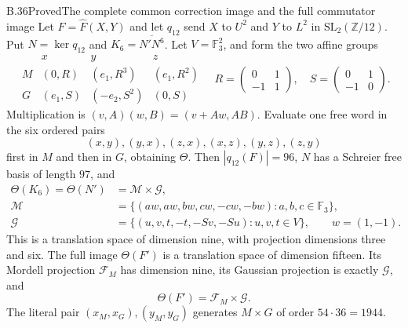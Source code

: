 \begin{statement}{B.36}{Proved}{The complete common correction image and the full commutator image}
Let $F=\widehat F(X,Y)$ and let $q_{12}$ send $X$ to
$U^2$ and $Y$ to $L^2$ in $\mathrm{SL}_2(\mathbb Z/12)$.
Put $N=\ker q_{12}$ and $K_6=\overline{N'N^6}$.
Let $V=\mathbb F_3^2$, and form the two affine groups
\[
 \begin{array}{c|ccc}
 &x&y&z\\ \hline
 M&(0,R)&(e_1,R^3)&(e_1,R^2)\\
 G&(e_1,S)&(-e_2,S^2)&(0,S)
 \end{array}
 \quad
 R=\begin{pmatrix}0&1\\-1&1\end{pmatrix},\quad
 S=\begin{pmatrix}0&1\\-1&0\end{pmatrix}.
\]
Multiplication is $(v,A)(w,B)=(v+Aw,AB)$. Evaluate one free
word in the six ordered pairs
\[
 (x,y),(y,x),(z,x),(x,z),(y,z),(z,y)
\]
first in $M$ and then in $G$, obtaining $\Theta$.
Then $|q_{12}(F)|=96$, $N$ has a Schreier free basis of length
$97$, and
\[
 \begin{split}
 \Theta(K_6)=\Theta(N')&=\mathcal M\times\mathcal G,\\
 \mathcal M&=\{(aw,aw,bw,cw,-cw,-bw):a,b,c\in\mathbb F_3\},\\
 \mathcal G&=\{(u,v,t,-t,-Sv,-Su):u,v,t\in V\},
 \qquad w=(1,-1).
 \end{split}                                                     \tag{ER1}
\]
This is a translation space of dimension nine, with projection
dimensions three and six. The full image $\Theta(F')$ is a
translation space of dimension fifteen. Its Mordell projection
$\mathcal F_M$ has dimension nine, its Gaussian projection is
exactly $\mathcal G$, and
\[
                         \Theta(F')=\mathcal F_M\times\mathcal G.
\]
The literal pair $(x_M,x_G),(y_M,y_G)$ generates $M\times G$ of
order $54\cdot36=1944$.
\end{statement}

